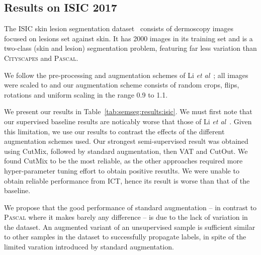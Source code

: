 \documentclass{bmvc2k}
\def\etal{\emph{et al}\bmvaOneDot}
\newcommand{\Cityscapes}{\textsc{Cityscapes}}
\newcommand{\Pascal}{\textsc{Pascal}}
\begin{document}
\subsection{Results on ISIC 2017}
\label{sec:consseg:res_isic}

The ISIC skin lesion segmentation dataset~\cite{Codella:ISIC2017} consists of dermoscopy images focused on lesions set against skin. It has 2000 images in its training set and is a two-class (skin and lesion)
segmentation problem, featuring far less variation than \Cityscapes{} and \Pascal{}. 

We follow the pre-processing and augmentation schemes of Li \etal~\cite{Li:SemiSupSkin}; all images were scaled to  and our augmentation scheme consists of
random  crops, flips, rotations and uniform scaling in the range 0.9 to 1.1.

We present our results in Table~\ref{tab:semseg:results:isic}. We must first note that our supervised baseline results are noticably worse that those of Li \etal~\cite{Li:SemiSupSkin}.
Given this limitation, we use our results to contrast the effects of the different augmentation schemes used.
Our strongest semi-supervised result was obtained using CutMix, followed by standard augmentation, then VAT and CutOut.
We found CutMix to be the most reliable, as the other approaches required more hyper-parameter tuning effort to obtain positive resutlts.
We were unable to obtain reliable performance from ICT, hence its result is worse than that of the baseline.

We propose that the good performance of standard augmentation -- in contrast to \Pascal{} where it makes barely any difference -- is due to the lack of variation in the dataset.
An augmented variant of an unsupervised sample is sufficient similar to other samples in the dataset to successfully propagate labels, in spite of the limited varation introduced by standard augmentation.
\end{document}
